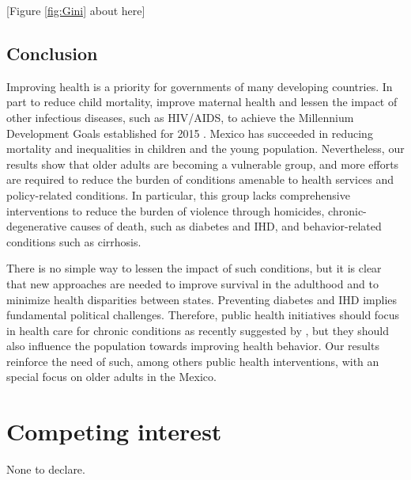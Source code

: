 \documentclass[11.5pt]{article}
\begin{document}
\begin{spacing}{1.5}
\begin{center}
[Figure \ref{fig:Gini} about here]
\end{center}

\subsection*{Conclusion}
Improving health is a priority for governments of many developing countries. In part to reduce child mortality, improve maternal health and lessen the impact of other infectious diseases, such as HIV/AIDS, to achieve the Millennium Development Goals established for 2015 \citep{united2009millennium}.  Mexico has succeeded in reducing mortality and inequalities in children and the young population. Nevertheless, our results show that older adults are becoming a vulnerable group, and more efforts are required to reduce the burden of conditions amenable to health services and policy-related conditions. In particular, this group lacks comprehensive interventions to reduce the burden of violence through homicides, chronic-degenerative
causes of death, such as diabetes and IHD, and behavior-related conditions such as cirrhosis.  

There is no simple way to lessen the impact of such conditions, but it is clear that new approaches are needed to improve survival in the adulthood and to minimize health disparities between states. Preventing diabetes and IHD implies fundamental political challenges. Therefore,  public health initiatives should focus in health care for chronic conditions as recently suggested by \citet{knaul2015achieving}, but they should also influence the population towards improving health behavior. Our results reinforce the need of such, among others public health interventions, with an special focus on older adults in the Mexico. 

\section*{Competing interest}
None to declare.

\end{spacing}


\end{document}
